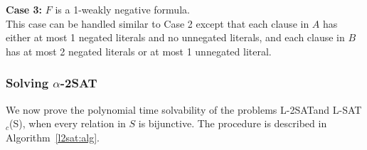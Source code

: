 \noindent
{\bf Case 3:}  $F$ is a 1-weakly negative formula.\\
This case can be handled similar to Case 2 except that each clause in $A$
has either at most 1 negated literals and no unnegated
literals, and each clause in $B$ has at most 2 negated literals or at most
1 unnegated literal.\QED


\subsubsection*{Solving $\alpha$-2SAT}
We now prove the polynomial time solvability of the problems {\sf L-2SAT}and
{\sf L-SAT$_c$(S)}, when every relation in $S$ is bijunctive. 
The procedure is described in Algorithm~\ref{l2sat:alg}.



\smallspacing

